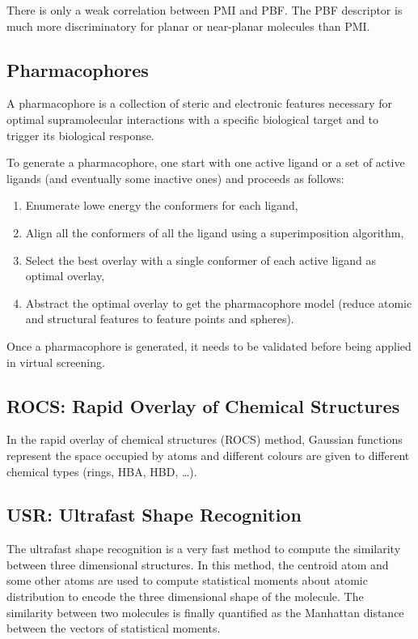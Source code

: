 There is only a weak correlation between PMI and PBF. The PBF descriptor is much more discriminatory for planar or near-planar molecules than PMI.


\subsection{Pharmacophores}

A pharmacophore is a collection of steric and electronic features necessary for optimal supramolecular interactions with a specific biological target and to trigger its biological response.

To generate a pharmacophore, one start with one active ligand or a set of active ligands (and eventually some inactive ones) and proceeds as follows:
\begin{enumerate}
    \item Enumerate lowe energy the conformers for each ligand,
    \item Align all the conformers of all the ligand using a superimposition algorithm,
    \item Select the best overlay with a single conformer of each active ligand as optimal overlay,
    \item Abstract the optimal overlay to get the pharmacophore model (reduce atomic and structural features to feature points and spheres).
\end{enumerate}

Once a pharmacophore is generated, it needs to be validated before being applied in virtual screening.


\subsection{ROCS: Rapid Overlay of Chemical Structures}

In the rapid overlay of chemical structures (ROCS) method, Gaussian functions represent the space occupied by atoms and different colours are given to different chemical types (rings, HBA, HBD, \dots).


\subsection{USR: Ultrafast Shape Recognition}

The ultrafast shape recognition is a very fast method to compute the similarity between three dimensional structures.
In this method, the centroid atom and some other atoms are used to compute statistical moments about atomic distribution to encode the three dimensional shape of the molecule.
The similarity between two molecules is finally quantified as the Manhattan distance between the vectors of statistical moments.


